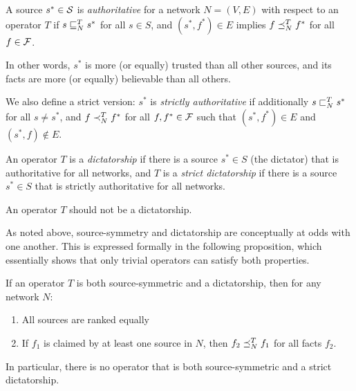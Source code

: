 \documentclass[../main.tex]{subfiles}
\begin{document}
\begin{definition}

A source $s^* \in \S$ is \emph{authoritative} for a network $N=(V, E)$ with
respect to an operator $T$ if $s \sle_N^T s^*$ for all $s \in S$, and $(s^*,
f^*) \in E$ implies $f \fle_N^T f^*$ for all $f \in \F$.

In other words, $s^*$ is more (or equally) trusted than all other sources, and
its facts are more (or equally) believable than all others.

We also define a strict version: $s^*$ is \emph{strictly authoritative} if
additionally $s \slt_N^T s^*$ for all $s \ne s^*$, and $f \flt_N^T f^*$ for all
$f, f^* \in \F$ such that $(s^*, f^*) \in E$ and $(s^*, f) \notin E$.

An operator $T$ is a \emph{dictatorship} if there is a source $s^* \in S$ (the
dictator) that is authoritative for all networks, and $T$ is a \emph{strict
dictatorship} if there is a source $s^* \in S$ that is strictly authoritative
for all networks.

\end{definition}

\begin{axiom}
\label{axiom:non_dict}
An operator $T$ should not be a dictatorship.
\end{axiom}

As noted above, source-symmetry and dictatorship are conceptually at odds with
one another. This is expressed formally in the following proposition, which
essentially shows that only trivial operators can satisfy both properties.

\begin{proposition}
\label{prop:symm_and_dict}

If an operator $T$ is both source-symmetric and a dictatorship, then for any
network $N$:
\begin{enumerate}
\item All sources are ranked equally
\item If $f_1$ is claimed by at least one source in $N$, then $f_2 \fle_N^T
f_1$ for all facts $f_2$.
\end{enumerate}

In particular, there is no operator that is both source-symmetric and a strict
dictatorship.
\end{proposition}
\end{document}
